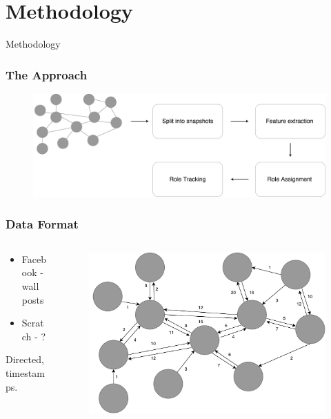 \section{Methodology}

\begin{frame}
\begin{center}
     	\huge Methodology
     \end{center}
\end{frame}

\begin{frame}
\frametitle{The Approach}
\begin{figure}
\includegraphics[scale=0.1]{graphics/setup.pdf}
\end{figure}
\end{frame}

\begin{frame}
\frametitle{Data Format}
\begin{columns}
	\begin{column}{0.4\textwidth}
			\begin{itemize}
				\item Facebook - wall posts 
				\item Scratch - ?
			\end{itemize}
			Directed, timestamps.
		\end{column}
		\begin{column}{0.6\textwidth}
			\begin{figure}
				\includegraphics[scale=0.27]{graphics/directed_network.pdf}
			\end{figure}
		\end{column}
	\end{columns}
\end{frame}

